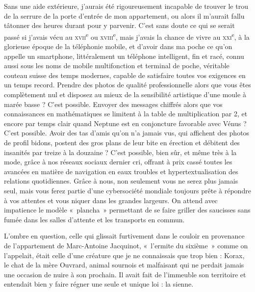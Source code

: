 \illusloflabel{}%
Sans une aide extérieure, j’aurais été rigoureusement incapable de trouver le trou de la serrure de la porte d’entrée de mon appartement, ou alors il m’aurait fallu tâtonner des heures durant pour y parvenir. C’est sans doute ce qui se serait passé si j’avais vécu au \textsc{xvii}\textsuperscript{e} ou \textsc{xviii}\textsuperscript{e}, mais j’avais la chance de vivre au \textsc{xxi}\textsuperscript{e}, à la glorieuse époque de la téléphonie mobile, et d’avoir dans ma poche ce qu’on appelle un smartphone, littéralement un téléphone intelligent, fin et racé, connu aussi sous les noms de mobile multifonction et terminal de poche, véritable couteau suisse des temps modernes, capable de satisfaire toutes vos exigences en un temps record. Prendre des photos de qualité professionnelle alors que vous êtes complètement nul et disposez au mieux de la sensibilité artistique d’une moule à marée basse ? C’est possible. Envoyer des messages chiffrés alors que vos connaissances en mathématiques se limitent à la table de multiplication par 2, et encore par temps clair quand Neptune est en conjoncture favorable avec Vénus ? C’est possible. Avoir des tas d’amis qu’on n’a jamais vus, qui affichent des photos de profil bidons, postent des gros plans de leur bite en érection et débitent des insanités par treize à la douzaine ? C’est possible, bien sûr, et même très à la mode, grâce à nos réseaux sociaux dernier cri, offrant à prix cassé toutes les avancées en matière de navigation en eaux troubles et hypertextualisation des relations quotidiennes. Grâce à nous, non seulement vous ne serez plus jamais seul, mais vous ferez partie d’une cybersociété mondiale toujours prête à répondre à vos attentes et vous niquer dans les grandes largeurs. On attend avec impatience le modèle «~plancha~» permettant de se faire griller des saucisses sans fumée dans les salles d’attente et les transports en commun.

L’ombre en question, celle qui glissait furtivement dans le couloir en provenance de l’appartement de Marc-Antoine Jacquinot, «~l’ermite du sixième~» comme on l’appelait, était celle d’une créature que je ne connaissais que trop bien : Korax, le chat de la mère Ouvrard, animal sournois et malfaisant qui ne perdait jamais une occasion de nuire à son prochain. Il avait fait de l’immeuble son territoire et entendait bien y faire régner une seule et unique loi : la sienne.

